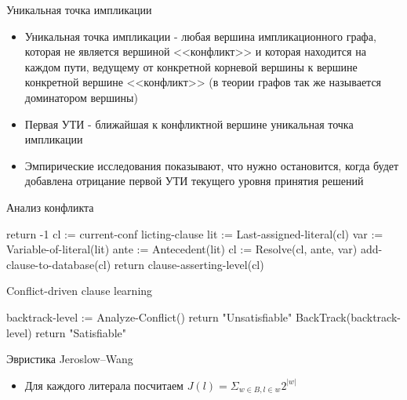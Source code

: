 \documentclass{beamer}
\begin{document}
\begin{frame}{Уникальная точка импликации}
\begin{itemize}
\item Уникальная точка импликации - любая вершина импликационного графа, которая не является вершиной <<конфликт>> и которая
находится на каждом пути, ведущему от конкретной корневой вершины к вершине конкретной вершине <<конфликт>> (в теории графов так
же называется доминатором вершины)
\item Первая УТИ - ближайшая к конфликтной вершине уникальная точка импликации
\item Эмпирические исследования показывают, что нужно остановится, когда будет добавлена отрицание первой УТИ текущего уровня
принятия решений
\end{itemize}
\end{frame}

\begin{frame}{Анализ конфликта}
\begin{algorithmic}
    \State return -1
\EndIf
\State cl := current-conf licting-clause
    \State lit := Last-assigned-literal(cl)
    \State var := Variable-of-literal(lit)
    \State ante := Antecedent(lit)
    \State cl := Resolve(cl, ante, var)
\EndWhile
\State add-clause-to-database(cl)
\State return clause-asserting-level(cl)
\end{algorithmic}
\end{frame}

\begin{frame}{Conflict-driven clause learning}
\begin{algorithmic}
            \State backtrack-level := Analyze-Conflict()
                \State return "Unsatisfiable"
            \EndIf
            \State BackTrack(backtrack-level)
                \State return "Satisfiable"
            \EndIf
        \EndWhile
    \EndWhile
\EndFunction
\end{algorithmic}
\end{frame}

\begin{frame}{Эвристика Jeroslow–Wang}
\begin{itemize}
\item Для каждого литерала посчитаем\newline
$J(l) = \Sigma_{w \in B, l \in w}2^{|w|}$
\end{itemize}
\end{frame}
\end{document}
